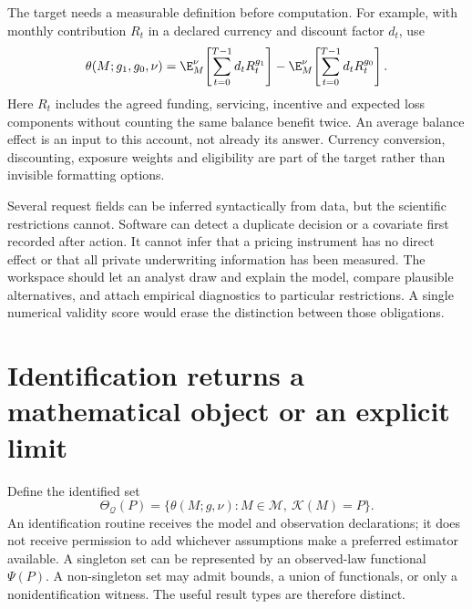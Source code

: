 The target needs a measurable definition before computation. For example,
with monthly contribution $R_t$ in a declared currency and discount
factor $d_t$, use
\[
 \theta(M;g_1,g_0,\nu)
 =\E^\nu_M\!\left[\sum_{t=0}^{T-1}d_tR_t^{g_1}\right]
  -\E^\nu_M\!\left[\sum_{t=0}^{T-1}d_tR_t^{g_0}\right].
\]
Here $R_t$ includes the agreed funding, servicing, incentive and expected
loss components without counting the same balance benefit twice.
An average balance effect is an input to this account, not already its
answer. Currency conversion, discounting, exposure weights and eligibility
are part of the target rather than invisible formatting options.

Several request fields can be inferred syntactically from data, but the
scientific restrictions cannot. Software can detect a duplicate decision
or a covariate first recorded after action. It cannot infer that a pricing
instrument has no direct effect or that all private underwriting
information has been measured. The workspace should let an analyst draw
and explain the model, compare plausible alternatives, and attach empirical
diagnostics to particular restrictions. A single numerical validity score
would erase the distinction between those obligations.

\section{Identification returns a mathematical object or an explicit limit}
\label{r3:identification-interface}

Define the identified set
\[
 \Theta_{\mathcal Q}(P)=
 \{\theta(M;g,\nu):M\in\mathcal M,\ \mathcal K(M)=P\}.
\]
An identification routine receives the model and observation declarations;
it does not receive permission to add whichever assumptions make a preferred
estimator available. A singleton set can be represented by an observed-law
functional $\Psi(P)$. A non-singleton set may admit bounds, a union of
functionals, or only a nonidentification witness. The useful result types
are therefore distinct.

